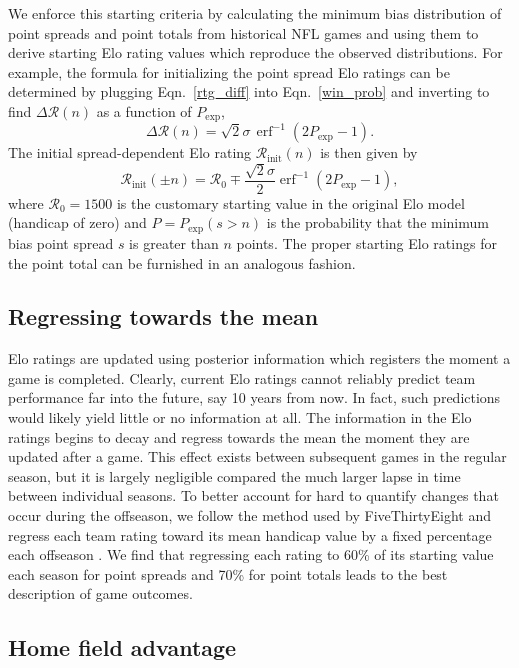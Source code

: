 \documentclass[aps,prc,reprint,amsmath,superscriptaddress,nofootinbib]{revtex4-1}
\newcommand{\R}{\mathcal{R}}
\DeclareMathOperator\erf{erf}
\begin{document}
We enforce this starting criteria by calculating the minimum bias distribution of point spreads and point totals from historical NFL games and using them to derive starting Elo rating values which reproduce the observed distributions.
For example, the formula for initializing the point spread Elo ratings can be determined by plugging Eqn.~\eqref{rtg_diff} into Eqn.~\eqref{win_prob} and inverting to find $\Delta \R(n)$ as a function of $P_\text{exp}$,
\begin{equation}
  \Delta \R(n) = \sqrt{2} \sigma\,  \erf^{-1}(2 P_\text{exp} - 1).
\end{equation}
The initial spread-dependent Elo rating $\R_\text{init}(n)$ is then given by
\begin{equation}
  \R_\text{init}(\pm n) = \R_0 \mp \frac{\sqrt{2}\sigma}{2} \erf^{-1}(2 P_\text{exp} - 1),
\end{equation}
where $\mathcal{R}_0 = 1500$ is the customary starting value in the original Elo model (handicap of zero) and ${P=P_\text{exp}(s > n)}$ is the probability that the minimum bias point spread $s$ is greater than $n$ points.
The proper starting Elo ratings for the point total can be furnished in an analogous fashion.

\subsection{Regressing towards the mean}

Elo ratings are updated using posterior information which registers the moment a game is completed.
Clearly, current Elo ratings cannot reliably predict team performance far into the future, say 10 years from now.
In fact, such predictions would likely yield little or no information at all.
The information in the Elo ratings begins to decay and regress towards the mean the moment they are updated after a game.
This effect exists between subsequent games in the regular season, but it is largely negligible compared the much larger lapse in time between individual seasons.
To better account for hard to quantify changes that occur during the offseason, we follow the method used by FiveThirtyEight and regress each team rating toward its mean handicap value by a fixed percentage each offseason \cite{538NFL, 538NBA}.
We find that regressing each rating to 60\% of its starting value each season for point spreads and 70\% for point totals leads to the best description of game outcomes.

\subsection{Home field advantage}
\end{document}
